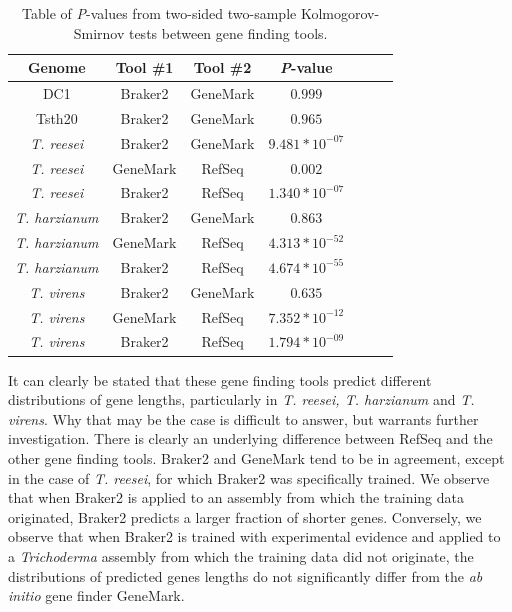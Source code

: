 \begin{table}
  \begin{center}
    \begin{tabular}{|c|c|c|c|c|c|c|}
      \hline
      Genome & Tool \#1 & Tool \#2 & \textit{P}-value  \\ \hline
      DC1 & Braker2 & GeneMark & $0.999$ \\ \hline
      Tsth20 & Braker2 & GeneMark & $0.965$ \\ \hline
      \textit{T. reesei} & Braker2 & GeneMark & $9.481*10^{-07}$ \\ \hline
      \textit{T. reesei} & GeneMark & RefSeq & $0.002$ \\ \hline
      \textit{T. reesei} & Braker2 & RefSeq & $1.340*10^{-07}$ \\ \hline
      \textit{T. harzianum} & Braker2 & GeneMark & $0.863$ \\ \hline
      \textit{T. harzianum} & GeneMark & RefSeq & $4.313*10^{-52}$ \\ \hline
      \textit{T. harzianum} & Braker2 & RefSeq & $4.674*10^{-55}$ \\ \hline
      \textit{T. virens} & Braker2 & GeneMark & $0.635$ \\ \hline
      \textit{T. virens} & GeneMark & RefSeq & $7.352*10^{-12}$ \\ \hline
      \textit{T. virens} & Braker2 & RefSeq & $1.794*10^{-09}$ \\ \hline
    \end{tabular}
  \end{center}
  \caption[Results of Kolmogorov-Smirnov tests]{Table of \textit{P}-values from two-sided two-sample
    Kolmogorov-Smirnov tests between gene finding tools.}\label{table:ks-2s}
\end{table}

It can clearly be stated that these gene finding tools predict
different distributions of gene lengths, particularly in
\textit{T. reesei, T. harzianum} and \textit{T. virens}. Why that may
be the case is difficult to answer, but warrants further investigation. There
is clearly an underlying difference between RefSeq and the other gene
finding tools. Braker2 and GeneMark tend to be in agreement, except in
the case of \textit{T. reesei}, for which Braker2 was specifically
trained. We observe that when Braker2 is applied to an assembly from
which the training data originated, Braker2 predicts a larger fraction
of shorter genes. Conversely, we observe that when Braker2 is trained
with experimental evidence and applied to a \textit{Trichoderma}
assembly from which the training data did not originate, the
distributions of predicted genes lengths do not significantly differ
from the \textit{ab initio} gene finder GeneMark.
